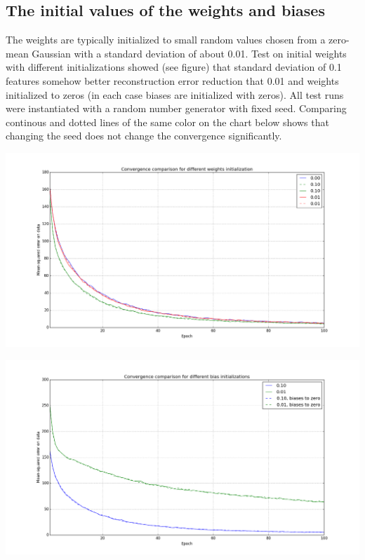 \documentclass[a4paper]{scrartcl}
\begin{document}
\subsection{The initial values of the weights and biases}
The weights are typically initialized to small random values chosen from a zero-mean Gaussian with a standard deviation of about 0.01. Test on initial weights with different initializations showed (see figure) that standard deviation of 0.1 features somehow better reconstruction error reduction that 0.01 and weights initialized to zeros (in each case biases are initialized with zeros).
All test runs were instantiated with a random number generator with fixed seed. Comparing continous and dotted lines of the same color on the chart below shows that changing the seed does not change the convergence significantly.
\vspace{-1em}
\begin{center}
\includegraphics[width=14cm]{images/weights_seeds.png}
\vspace{-2em}
\end{center}
\begin{center}
\includegraphics[width=14cm]{images/bias.png}
\vspace{-2em}
\end{center}
\end{document}
